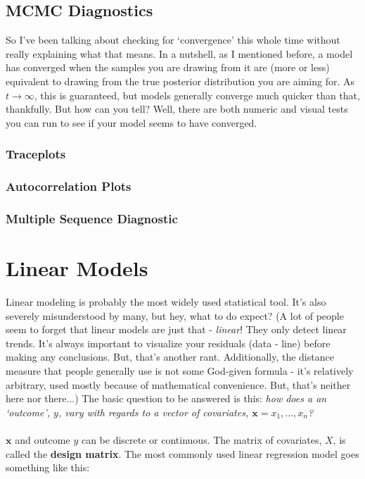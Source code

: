 \documentclass[12pt]{book}
\begin{document}
\section{MCMC Diagnostics}
So I've been talking about checking for `convergence' this whole time without really explaining what that means. In a nutshell, as I mentioned before, a model has converged when the samples you are drawing from it are (more or less) equivalent to drawing from the true posterior distribution you are aiming for. As $t \to \infty$, this is guaranteed, but models generally converge much quicker than that, thankfully. But how can you tell? Well, there are both numeric and visual tests you can run to see if your model seems to have converged.
\subsection{Traceplots}
\subsection{Autocorrelation Plots}
\subsection{Multiple Sequence Diagnostic}


\chapter{Linear Models}
Linear modeling is probably the most widely used statistical tool. It's also severely misunderstood by many, but  hey, what to do expect? (A lot of people seem to forget that linear models are just that - \textit{linear}! They only detect linear trends. It's always important to visualize your residuals (data - line) before making any conclusions. But, that's another rant. Additionally, the distance measure that people generally use is not some God-given formula - it's relatively arbitrary, used mostly because of mathematical convenience. But, that's neither here nor there...) The basic question to be answered is this: \textit{how does a an `outcome', $y$, vary with regards to a vector of covariates, $\textbf{x} = x_1, \dots, x_n$?}
\\\\
$\textbf{x}$ and outcome $y$ can be discrete or continuous. The matrix of covariates, $X$, is called the \textbf{design matrix}. The most commonly used linear regression model goes something like this:
	
\end{document}
